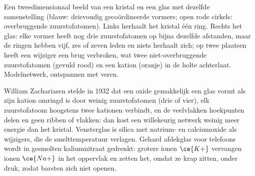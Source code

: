 \begin{omfigure}

{\small Een tweedimensionaal beeld van een kristal en een glas met
dezelfde samenstelling (blauw: drievoudig gecoördineerde vormers; open
rode cirkels: overbruggende zuurstofatomen). Links herhaalt het kristal
één ring. Rechts het glas: elke vormer heeft nog drie zuurstofatomen op
bijna dezelfde afstanden, maar de ringen hebben vijf, zes of zeven
leden en niets herhaalt zich; op twee plaatsen heeft een wijziger een
brug verbroken, wat twee niet-overbruggende zuurstofatomen (gevuld rood)
en een kation (oranje) in de holte achterlaat. Modelnetwerk, ontspannen
met veren.}
\end{omfigure}

William Zachariasen stelde in 1932 dat een oxide gemakkelijk een glas
vormt als zijn kation omringd is door weinig zuurstofatomen (drie of
vier), elk zuurstofatoom hoogstens twee kationen verbindt, en de
veelvlakken hoekpunten delen en geen ribben of vlakken: dan kost een
willekeurig netwerk weinig meer energie dan het kristal. Vensterglas is
silica met natrium- en calciumoxide als wijzigers, die de smelttemperatuur
verlagen. Gehard afdekglas voor telefoons wordt in gesmolten
kaliumnitraat gedrenkt: grotere ionen $\ce{K+}$ vervangen ionen $\ce{Na+}$ in het oppervlak en zetten het,
omdat ze krap zitten, onder druk, zodat barsten zich niet openen.


